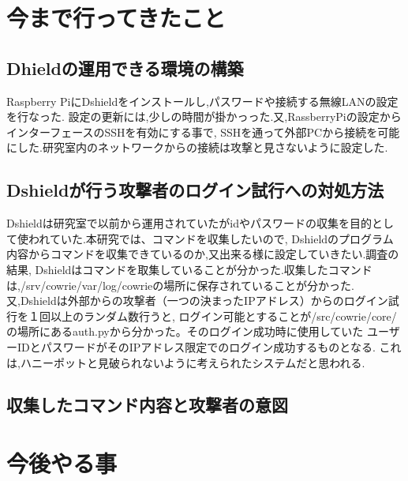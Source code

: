 \documentclass{entry}
\begin{document}
\section{今まで行ってきたこと}
\subsection{Dhieldの運用できる環境の構築}
Raspberry PiにDshieldをインストールし,パスワードや接続する無線LANの設定を行なった.
設定の更新には,少しの時間が掛かっった.又,RassberryPiの設定からインターフェースのSSHを有効にする事で,
SSHを通って外部PCから接続を可能にした.研究室内のネットワークからの接続は攻撃と見さないように設定した.
\subsection{Dshieldが行う攻撃者のログイン試行への対処方法}
Dshieldは研究室で以前から運用されていたがidやパスワードの収集を目的として使われていた.本研究では、コマンドを収集したいので,
Dshieldのプログラム内容からコマンドを収集できているのか,又出来る様に設定していきたい.調査の結果,
Dshieldはコマンドを取集していることが分かった.収集したコマンドは,/srv/cowrie/var/log/cowrieの場所に保存されていることが分かった.
又,Dshieldは外部からの攻撃者（一つの決まったIPアドレス）からのログイン試行を１回以上のランダム数行うと,
ログイン可能とすることが/src/cowrie/core/の場所にあるauth.pyから分かった。そのログイン成功時に使用していた
ユーザーIDとパスワードがそのIPアドレス限定でのログイン成功するものとなる.
これは,ハニーポットと見破られないように考えられたシステムだと思われる.

\subsection{収集したコマンド内容と攻撃者の意図}


\section{今後やる事}




%

\end{document}
